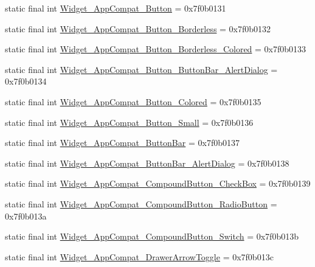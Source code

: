 \begin{CompactItemize}
\item 
static final int \hyperlink{classandroid_1_1support_1_1mediacompat_1_1_r_1_1style_1792607a3c21550c73466a2a8308498f}{Widget\_\-AppCompat\_\-Button} = 0x7f0b0131
\item 
static final int \hyperlink{classandroid_1_1support_1_1mediacompat_1_1_r_1_1style_9ff0d4aff276e801e7b07fe14c051e90}{Widget\_\-AppCompat\_\-Button\_\-Borderless} = 0x7f0b0132
\item 
static final int \hyperlink{classandroid_1_1support_1_1mediacompat_1_1_r_1_1style_44ed235e625b09ef89e7cbe35d649e75}{Widget\_\-AppCompat\_\-Button\_\-Borderless\_\-Colored} = 0x7f0b0133
\item 
static final int \hyperlink{classandroid_1_1support_1_1mediacompat_1_1_r_1_1style_67ba7d594117cd80a8e7d874ec82baeb}{Widget\_\-AppCompat\_\-Button\_\-ButtonBar\_\-AlertDialog} = 0x7f0b0134
\item 
static final int \hyperlink{classandroid_1_1support_1_1mediacompat_1_1_r_1_1style_8514bdf0ae6c0ead8b01da2c02be84c5}{Widget\_\-AppCompat\_\-Button\_\-Colored} = 0x7f0b0135
\item 
static final int \hyperlink{classandroid_1_1support_1_1mediacompat_1_1_r_1_1style_ca8b9dc033b0ad6bbc09aadc7c3062a7}{Widget\_\-AppCompat\_\-Button\_\-Small} = 0x7f0b0136
\item 
static final int \hyperlink{classandroid_1_1support_1_1mediacompat_1_1_r_1_1style_d7668392e0b2356e7e0cd37423823d4b}{Widget\_\-AppCompat\_\-ButtonBar} = 0x7f0b0137
\item 
static final int \hyperlink{classandroid_1_1support_1_1mediacompat_1_1_r_1_1style_5174d09c9fc3f19c73cfbaa97de89fee}{Widget\_\-AppCompat\_\-ButtonBar\_\-AlertDialog} = 0x7f0b0138
\item 
static final int \hyperlink{classandroid_1_1support_1_1mediacompat_1_1_r_1_1style_69b27b63a9badd0d4e2fe54f9beaa3f6}{Widget\_\-AppCompat\_\-CompoundButton\_\-CheckBox} = 0x7f0b0139
\item 
static final int \hyperlink{classandroid_1_1support_1_1mediacompat_1_1_r_1_1style_36cf0c7b9d38978910497fc11b12c516}{Widget\_\-AppCompat\_\-CompoundButton\_\-RadioButton} = 0x7f0b013a
\item 
static final int \hyperlink{classandroid_1_1support_1_1mediacompat_1_1_r_1_1style_6ede15bde8737b21b4de964a67c994dd}{Widget\_\-AppCompat\_\-CompoundButton\_\-Switch} = 0x7f0b013b
\item 
static final int \hyperlink{classandroid_1_1support_1_1mediacompat_1_1_r_1_1style_8daddbe83ef3aafee7b153c56b882265}{Widget\_\-AppCompat\_\-DrawerArrowToggle} = 0x7f0b013c

\end{CompactItemize}
